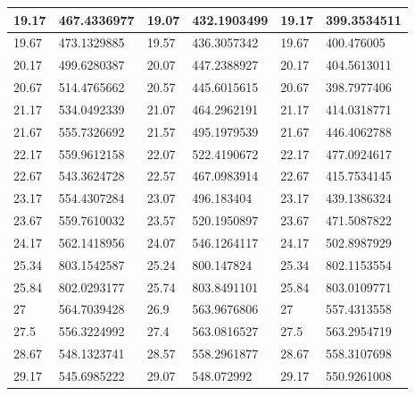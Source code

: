 \documentclass[11pt, letterpaper]{article}
\begin{document}
\begin{appendices}
\begin{table}[!ht]
\begin{tabular}{|l|l|l|l|l|l|}
        19.17 & 467.4336977 & 19.07 & 432.1903499 & 19.17 & 399.3534511 \\ \hline
        19.67 & 473.1329885 & 19.57 & 436.3057342 & 19.67 & 400.476005 \\ \hline
        20.17 & 499.6280387 & 20.07 & 447.2388927 & 20.17 & 404.5613011 \\ \hline
        20.67 & 514.4765662 & 20.57 & 445.6015615 & 20.67 & 398.7977406 \\ \hline
        21.17 & 534.0492339 & 21.07 & 464.2962191 & 21.17 & 414.0318771 \\ \hline
        21.67 & 555.7326692 & 21.57 & 495.1979539 & 21.67 & 446.4062788 \\ \hline
        22.17 & 559.9612158 & 22.07 & 522.4190672 & 22.17 & 477.0924617 \\ \hline
        22.67 & 543.3624728 & 22.57 & 467.0983914 & 22.67 & 415.7534145 \\ \hline
        23.17 & 554.4307284 & 23.07 & 496.183404 & 23.17 & 439.1386324 \\ \hline
        23.67 & 559.7610032 & 23.57 & 520.1950897 & 23.67 & 471.5087822 \\ \hline
        24.17 & 562.1418956 & 24.07 & 546.1264117 & 24.17 & 502.8987929 \\ \hline
        25.34 & 803.1542587 & 25.24 & 800.147824 & 25.34 & 802.1153554 \\ \hline
        25.84 & 802.0293177 & 25.74 & 803.8491101 & 25.84 & 803.0109771 \\ \hline
        27 & 564.7039428 & 26.9 & 563.9676806 & 27 & 557.4313558 \\ \hline
        27.5 & 556.3224992 & 27.4 & 563.0816527 & 27.5 & 563.2954719 \\ \hline
        28.67 & 548.1323741 & 28.57 & 558.2961877 & 28.67 & 558.3107698 \\ \hline
        29.17 & 545.6985222 & 29.07 & 548.072992 & 29.17 & 550.9261008 \\ \hline
    \end{tabular}
\end{table}


\end{appendices}
\end{document}
